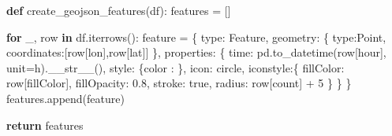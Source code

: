 \documentclass[
  letterpaper,
  DIV=11,
  numbers=noendperiod]{scrreprt}
\newenvironment{Shaded}{\begin{snugshade}}{\end{snugshade}}
\newcommand{\ControlFlowTok}[1]{\textcolor[rgb]{0.00,0.23,0.31}{\textbf{#1}}}
\newcommand{\DecValTok}[1]{\textcolor[rgb]{0.68,0.00,0.00}{#1}}
\newcommand{\FloatTok}[1]{\textcolor[rgb]{0.68,0.00,0.00}{#1}}
\newcommand{\FunctionTok}[1]{\textcolor[rgb]{0.28,0.35,0.67}{#1}}
\newcommand{\KeywordTok}[1]{\textcolor[rgb]{0.00,0.23,0.31}{\textbf{#1}}}
\newcommand{\NormalTok}[1]{\textcolor[rgb]{0.00,0.23,0.31}{#1}}
\newcommand{\OperatorTok}[1]{\textcolor[rgb]{0.37,0.37,0.37}{#1}}
\newcommand{\StringTok}[1]{\textcolor[rgb]{0.13,0.47,0.30}{#1}}
\begin{document}
\begin{Shaded}
\begin{Highlighting}[]
\KeywordTok{def}\NormalTok{ create\_geojson\_features(df):}
\NormalTok{    features }\OperatorTok{=}\NormalTok{ []}
    
    \ControlFlowTok{for}\NormalTok{ \_, row }\KeywordTok{in}\NormalTok{ df.iterrows():}
\NormalTok{        feature }\OperatorTok{=}\NormalTok{ \{}
            \StringTok{\textquotesingle{}type\textquotesingle{}}\NormalTok{: }\StringTok{\textquotesingle{}Feature\textquotesingle{}}\NormalTok{,}
            \StringTok{\textquotesingle{}geometry\textquotesingle{}}\NormalTok{: \{}
                \StringTok{\textquotesingle{}type\textquotesingle{}}\NormalTok{:}\StringTok{\textquotesingle{}Point\textquotesingle{}}\NormalTok{, }
                \StringTok{\textquotesingle{}coordinates\textquotesingle{}}\NormalTok{:[row[}\StringTok{\textquotesingle{}lon\textquotesingle{}}\NormalTok{],row[}\StringTok{\textquotesingle{}lat\textquotesingle{}}\NormalTok{]]}
\NormalTok{            \},}
            \StringTok{\textquotesingle{}properties\textquotesingle{}}\NormalTok{: \{}
                \StringTok{\textquotesingle{}time\textquotesingle{}}\NormalTok{: pd.to\_datetime(row[}\StringTok{\textquotesingle{}hour\textquotesingle{}}\NormalTok{], unit}\OperatorTok{=}\StringTok{\textquotesingle{}h\textquotesingle{}}\NormalTok{).}\FunctionTok{\_\_str\_\_}\NormalTok{(),}
                \StringTok{\textquotesingle{}style\textquotesingle{}}\NormalTok{: \{}\StringTok{\textquotesingle{}color\textquotesingle{}}\NormalTok{ : }\StringTok{\textquotesingle{}\textquotesingle{}}\NormalTok{\},}
                \StringTok{\textquotesingle{}icon\textquotesingle{}}\NormalTok{: }\StringTok{\textquotesingle{}circle\textquotesingle{}}\NormalTok{,}
                \StringTok{\textquotesingle{}iconstyle\textquotesingle{}}\NormalTok{:\{}
                    \StringTok{\textquotesingle{}fillColor\textquotesingle{}}\NormalTok{: row[}\StringTok{\textquotesingle{}fillColor\textquotesingle{}}\NormalTok{],}
                    \StringTok{\textquotesingle{}fillOpacity\textquotesingle{}}\NormalTok{: }\FloatTok{0.8}\NormalTok{,}
                    \StringTok{\textquotesingle{}stroke\textquotesingle{}}\NormalTok{: }\StringTok{\textquotesingle{}true\textquotesingle{}}\NormalTok{,}
                    \StringTok{\textquotesingle{}radius\textquotesingle{}}\NormalTok{: row[}\StringTok{\textquotesingle{}count\textquotesingle{}}\NormalTok{] }\OperatorTok{+} \DecValTok{5}
\NormalTok{                \}}
\NormalTok{            \}}
\NormalTok{        \}}
\NormalTok{        features.append(feature)}
   
    \ControlFlowTok{return}\NormalTok{ features}
\end{Highlighting}
\end{Shaded}
\end{document}
